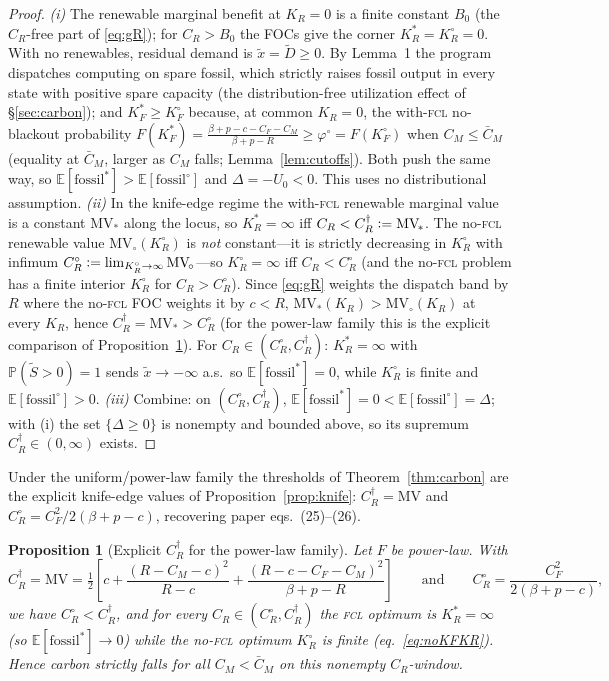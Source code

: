 \documentclass[11pt,reqno]{amsart}
\theoremstyle{plain}
\newtheorem{proposition}{Proposition}
\theoremstyle{definition}
\theoremstyle{remark}
\newcommand{\KR}{K_R}
\newcommand{\KRs}{K_R^{*}}
\newcommand{\KFs}{K_F^{*}}
\newcommand{\KRo}{K_R^{\circ}}
\newcommand{\KFo}{K_F^{\circ}}
\newcommand{\CM}{C_M}
\newcommand{\CF}{C_F}
\newcommand{\CR}{C_R}
\newcommand{\CMbar}{\bar C_M}
\newcommand{\bp}{\beta+p}
\newcommand{\E}{\mathbb{E}}
\newcommand{\PP}{\mathbb{P}}
\newcommand{\eqdef}{\vcentcolon=}
\begin{document}
\begin{proof}
\emph{(i)} The renewable marginal benefit at $\KR=0$ is a finite constant $B_0$
(the $\CR$-free part of \eqref{eq:gR}); for $\CR>B_0$ the FOCs give the corner
$\KRs=\KRo=0$. With no renewables, residual demand is $\tilde x=\tilde D\ge0$. By
Lemma~1 the program dispatches computing on spare fossil, which strictly raises
fossil output in every state with positive spare capacity (the distribution-free
utilization effect of \S\ref{sec:carbon}); and $\KFs\ge\KFo$ because, at common
$\KR=0$, the with-\textsc{fcl} no-blackout probability
$F(\KFs)=\frac{\bp-c-\CF-\CM}{\bp-R}\ge\varphi^{\circ}=F(\KFo)$ when $\CM\le\CMbar$
(equality at $\CMbar$, larger as $\CM$ falls; Lemma~\ref{lem:cutoffs}). Both push
the same way, so $\E[\text{fossil}^{*}]>\E[\text{fossil}^{\circ}]$ and
$\Delta=-U_0<0$. This uses no distributional assumption.
\emph{(ii)} In the knife-edge regime the with-\textsc{fcl} renewable marginal value is a
constant $\mathrm{MV}_{\!*}$ along the locus, so $\KRs=\infty$ iff
$\CR<\CR^{\dagger}\eqdef\mathrm{MV}_{\!*}$. The no-\textsc{fcl} renewable value
$\mathrm{MV}_{\!\circ}(\KRo)$ is \emph{not} constant---it is strictly decreasing in $\KRo$
with infimum $\CR^{\circ}\eqdef\lim_{\KRo\to\infty}\mathrm{MV}_{\!\circ}$---so $\KRo=\infty$
iff $\CR<\CR^{\circ}$ (and the no-\textsc{fcl} problem has a finite interior $\KRo$ for
$\CR>\CR^{\circ}$). Since \eqref{eq:gR} weights the dispatch band by $R$ where the
no-\textsc{fcl} FOC weights it by $c<R$, $\mathrm{MV}_{\!*}(\KR)>\mathrm{MV}_{\!\circ}(\KR)$
at every $\KR$, hence $\CR^{\dagger}=\mathrm{MV}_{\!*}>\CR^{\circ}$ (for the power-law family
this is the explicit comparison of Proposition~\ref{prop:CRdag}).
For $\CR\in(\CR^{\circ},\CR^{\dagger})$: $\KRs=\infty$ with $\PP(\tilde S>0)=1$ sends
$\tilde x\to-\infty$ a.s.\ so $\E[\text{fossil}^{*}]=0$, while $\KRo$ is finite and
$\E[\text{fossil}^{\circ}]>0$.
\emph{(iii)} Combine: on $(\CR^{\circ},\CR^{\dagger})$, $\E[\text{fossil}^{*}]=0<\E[\text{fossil}^{\circ}]=\Delta$;
with (i) the set $\{\Delta\ge0\}$ is nonempty and bounded above, so its supremum
$\CR^{\dagger}\in(0,\infty)$ exists.
\end{proof}

\noindent Under the uniform/power-law family the thresholds of
Theorem~\ref{thm:carbon} are the explicit knife-edge values of
Proposition~\ref{prop:knife}: $\CR^{\dagger}=\mathrm{MV}$ and
$\CR^{\circ}=\CF^2/2(\bp-c)$, recovering paper eqs.\ (25)--(26).

\begin{proposition}[Explicit $\CR^{\dagger}$ for the power-law family]\label{prop:CRdag}
Let $F$ be power-law. With
\[
  \CR^{\dagger}=\mathrm{MV}
  =\tfrac12\!\left[c+\frac{(R-\CM-c)^2}{R-c}+\frac{(R-c-\CF-\CM)^2}{\bp-R}\right]
  \qquad\text{and}\qquad
  \CR^{\circ}=\frac{\CF^{2}}{2(\bp-c)},
\]
we have $\CR^{\circ}<\CR^{\dagger}$, and for every $\CR\in(\CR^{\circ},\CR^{\dagger})$
the \textsc{fcl} optimum is $\KRs=\infty$ (so $\E[\text{fossil}^{*}]\!\to\!0$)
while the no-\textsc{fcl} optimum $\KRo$ is finite (eq.\ \eqref{eq:noKFKR}). Hence
carbon strictly falls for all $\CM<\CMbar$ on this nonempty $\CR$-window.
\end{proposition}
\end{document}
